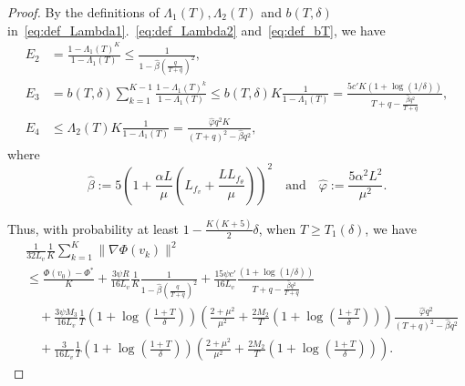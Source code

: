 \documentclass[11 pt]{article}
\begin{document}
\begin{proof}
By the definitions of $\Lambda_1(T),\Lambda_2(T)$ and $b(T,\delta)$ in~\eqref{eq:def_Lambda1}.~\eqref{eq:def_Lambda2} and~\eqref{eq:def_bT}, we have
\begin{align*}
    E_2 &= \frac{1-\Lambda_1(T)^K}{1-\Lambda_1(T)}\leq \frac{1}{1-\hat{\beta}\left(\frac{q}{T+q}\right)^2},\\
    E_3&= b(T,\delta)\sum_{k=1}^{K-1}\frac{1-\Lambda_1(T)^k}{1-\Lambda_1(T)}\leq b(T,\delta)K\frac{1}{1-\Lambda_1(T)}= \frac{5c'K\left( 1+\log(1/\delta)\right)}{T+q-\frac{\hat{\beta}q^2}{T+q}},\\
    E_4 & \leq \Lambda_2(T)K\frac{1}{1-\Lambda_1(T)}= \frac{\hat{\varphi}q^2K}{(T+q)^2-\hat{\beta}q^2},
\end{align*}
where 
\[
\hat{\beta}:=5\left( 1 + \frac{\alpha L}{\mu}   \left(L_{f_v}+\frac{LL_{f_\theta}}{\mu} \right)\right)^2\quad \text{and} \quad \hat{\varphi}:=\frac{5\alpha^2 L^2}{\mu^2}.
\]

Thus, with probability at least $1-\frac{K(K+5)}{2}\delta$,
when $T\geq T_1(\delta)$, we have
\begin{align*}
    &\frac{1}{32L_v}\frac{1}{K}\sum_{k=1}^{K}\|\nabla\Phi(v_k) \|^2 \nonumber \\
    &\leq \frac{\Phi(v_0)-\Phi^*}{K} + \frac{3\psi R}{16L_v} \frac{1}{K} \frac{1}{1-\hat{\beta}\left(\frac{q}{T+q}\right)^2} + \frac{15\psi c'}{16L_v} \frac{\left( 1+\log(1/\delta)\right)}{T+q-\frac{\hat{\beta}q^2}{T+q}} \nonumber\\
    &\quad +\frac{3\psi M_3}{16L_v} \frac{1}{T}\left(1+\log(\frac{1+T}{\delta})\right)\left( \frac{2+\mu^2}{\mu^2} + \frac{2M_2}{T}\left(1+\log(\frac{1+T}{\delta})\right)\right)  \frac{\hat{\varphi}q^2}{(T+q)^2-\hat{\beta}q^2}  \nonumber \\
    &\quad + \frac{3}{16L_v}\frac{1}{T}\left(1+\log(\frac{1+T}{\delta})\right)\left( \frac{2+\mu^2}{\mu^2} + \frac{2M_2}{T}\left(1+\log(\frac{1+T}{\delta})\right)\right).
\end{align*}


\end{proof}
\end{document}
